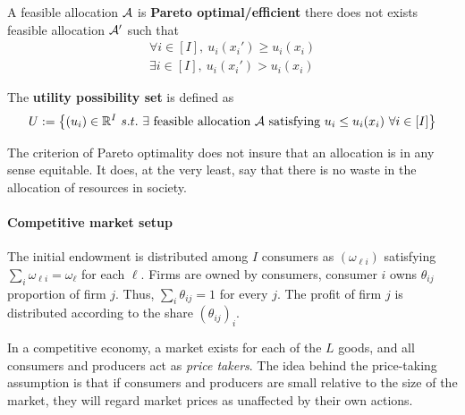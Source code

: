 \documentclass{article}
\begin{document}
	 	\begin{definition}[1.B.2]
	 		A feasible allocation $\mathcal{{A}}$ is \textbf{Pareto optimal/efficient} there does not exists feasible allocation $\mathcal{{A}}'$ such that
	 		\begin{gather}
	 			\forall i \in [I],\ u_i(x_i') \geq u_i(x_i)\\
	 			\exists i \in [I],\ u_i(x_i') > u_i(x_i)
	 		\end{gather}
	 	\end{definition}
	 	
	 	\begin{definition}
	 		The \textbf{utility possibility set} is defined as 
	 		\begin{equation}
	 			U := \left \{
	 				(u_i) \in \R^I\ s.t.\ 
	 				\exists \tx{ feasible allocation } \mc{A} \tx{ satisfying } 
	 				u_i \leq u_i(x_i)\ \forall i \in [I]
	 			\right \}
	 		\end{equation}
	 	\end{definition}
	 	
	 	\begin{remark}
	 		The criterion of Pareto optimality does not insure that an allocation is in any sense equitable. It does, at the very least, say that there is no waste in the allocation of resources in society.
	 	\end{remark}
	 	
	 	\paragraph{Competitive market setup} The initial endowment is distributed among $I$ consumers as $(\omega_{\ell i})$ satisfying $\sum_i \omega_{\ell i} = \omega_\ell$ for each $\ell$. Firms are owned by consumers, consumer $i$ owns $\theta_{ij}$ proportion of firm $j$. Thus, $\sum_{i} \theta_{ij} = 1$ for every $j$. The profit of firm $j$ is distributed according to the share $(\theta_{ij})_i$.
	 	
	 	\begin{assumption}
	 		In a competitive economy, a market exists for each of the $L$ goods, and all consumers and producers act as \emph{price takers}. The idea behind the price-taking assumption is that if consumers and producers are small relative to the size of the market, they will regard market prices as unaffected by their own actions.
	 	\end{assumption}
	 	
\end{document}
